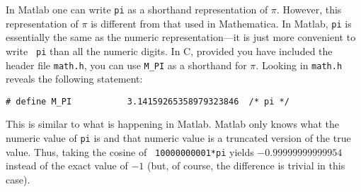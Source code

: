 In Matlab one can write {\tt pi} as a shorthand representation of
$\pi$.  However, this representation of $\pi$ is different from that
used in Mathematica.  In Matlab, {\tt pi} is essentially the same as
the numeric representation---it is just more convenient to write {\tt
pi} than all the numeric digits.  In C, provided you have included the
header file {\tt math.h}, you can use {\tt M\_PI} as a shorthand for
$\pi$.  Looking in {\tt math.h} reveals the following statement:
\begin{verbatim}
# define M_PI           3.14159265358979323846  /* pi */
\end{verbatim}
This is similar to what is happening in Matlab.  Matlab only knows
what the numeric value of {\tt pi} is and that numeric value is a
truncated version of the true value.  Thus, taking the cosine of {\tt
10000000001*pi} yields $-0.99999999999954$ instead of the exact value
of $-1$ (but, of course, the difference is trivial in this case).


